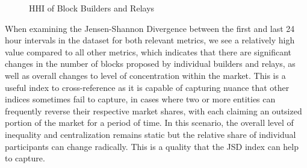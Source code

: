 \documentclass[conference]{IEEEtran}
\begin{document}
\begin{figure}[ht]
\caption{HHI of Block Builders and Relays}
\label{fig:HHI block builder relays}
\end{figure}

When examining the Jensen-Shannon Divergence between the first and last 24 hour intervals in the dataset for both relevant metrics, we see a relatively high value compared to all other metrics, which indicates that there are significant changes in the number of blocks proposed by individual builders and relays, as well as overall changes to level of concentration within the market.  This is a useful index to cross-reference as it is capable of capturing nuance that other indices sometimes fail to capture, in cases where two or more entities can frequently reverse their respective market shares, with each claiming an outsized portion of the market for a period of time.  In this scenario, the overall level of inequality and centralization remains static but the relative share of individual participants can change radically.  This is a quality that the JSD index can help to capture.

\vspace{8pt}
\end{document}
